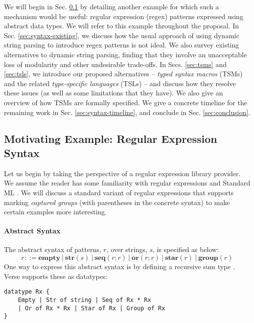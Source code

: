 We will begin in Sec. \ref{sec:examples} by detailing another example for which such a mechanism would be useful: regular expression (regex) patterns expressed using abstract data types. We will refer to this example throughout the proposal. In Sec. \ref{sec:syntax-existing}, we discuss how the usual approach of using dynamic string parsing to introduce regex patterns is not ideal. We also survey existing alternatives to dynamic string parsing, finding that they involve an unacceptable loss of modularity and other undesirable trade-offs. In Secs. \ref{sec:tsms} and \ref{sec:tsls}, we introduce our proposed alternatives -- \emph{typed syntax macros} (TSMs) and the related \emph{type-specific languages} (TSLs) -- and discuss how they resolve these issues (as well as some limitations that they have). We  also give an overview of how TSMs are formally specified. We give a concrete timeline for the remaining work in Sec. \ref{sec:syntax-timeline}, and conclude in Sec. \ref{sec:conclusion}.


\subsection{Motivating Example: Regular Expression Syntax}\label{sec:examples}\label{sec:syntax-examples}
Let us begin by taking the perspective of a regular expression library provider. We assume the reader has some familiarity with regular expressions \cite{Thompson:1968:PTR:363347.363387} and Standard ML \cite{harper1997programming}. We will discuss a standard variant of regular expressions that supports marking \emph{captured groups} (with parentheses in the concrete syntax) to make certain examples more interesting.

\paragraph{Abstract Syntax} The abstract syntax of {patterns}, $r$, over strings, $s$, is specified as below:\[r ::= \textbf{empty} ~|~ \textbf{str}(s) ~|~ \textbf{seq}(r; r) ~|~ \textbf{or}(r; r) ~|~ \textbf{star}(r) ~|~ \textbf{group}(r)\]
One way to express this abstract syntax is by defining a recursive sum type \cite{pfpl}. Verse supports these as datatypes:

\begin{lstlisting}[numbers=none]
datatype Rx {
    Empty | Str of string | Seq of Rx * Rx 
    | Or of Rx * Rx | Star of Rx | Group of Rx
}
\end{lstlisting}

